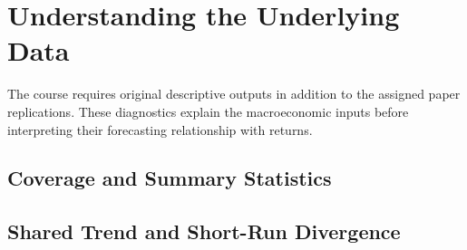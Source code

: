 \section{Understanding the Underlying Data}

The course requires original descriptive outputs in addition to the assigned
paper replications. These diagnostics explain the macroeconomic inputs before
interpreting their forecasting relationship with returns.

\subsection{Coverage and Summary Statistics}
\DataCoverageFinding


\subsection{Shared Trend and Short-Run Divergence}
\DataAnatomyFinding

